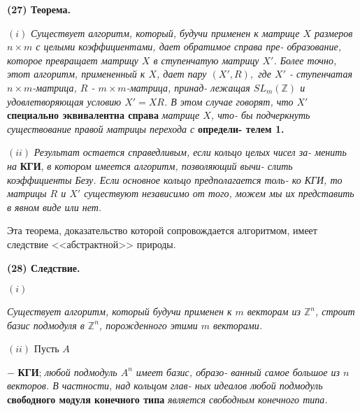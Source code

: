 	\pagebreak
	
	
	\noindent
	{\bf (27) Теорема.}
	
	$(i)$ {\it Существует алгоритм, который, будучи применен к матрице $X$\linebreak
	размеров $n\times m$ с целыми коэффициентами, дает обратимое справа пре-\linebreak
	образование, которое превращает матрицу $X$ в ступенчатую матрицу\linebreak
	$X'$. Более точно, этот алгоритм, примененный к $X$, дает пару $(X', R),$\linebreak
	где $X'$ - ступенчатая $n\times m$-матрица, $R$ - $m\times m$-матрица, принад-\linebreak
	лежащая $SL_{m}(\mathbb Z)$ и удовлетворяющая условию $X' = XR$. В этом случае\linebreak
	говорят, что $X'$} {\bf специально эквивалентна справа} {\it матрице $X$, \it что-\linebreak
	бы подчеркнуть существование правой матрицы перехода с} {\bf определи-\linebreak
	телем 1.}
	
	$(ii)$ {\it Результат остается справедливым, если кольцо целых чисел за-\linebreak
	менить на} {\bf КГИ}, {\it в котором имеется алгоритм, позволяющий вычи-\linebreak
	слить коэффициенты Безу. Если основное кольцо предполагается толь-\linebreak
	ко КГИ, то матрицы $R$ и $X'$ существуют независимо от того, можем\linebreak
	мы их представить в явном виде или нет.}
	
	Эта теорема, доказательство которой сопровождается алгоритмом,\linebreak
	имеет следствие <<абстрактной>> природы.
	
	\noindent
	{\bf (28) Следствие.}
	
	$(i)$ {\it Существует алгоритм, который будучи применен к $m$ векторам\linebreak
	из ${\mathbb Z}^{n}$, строит базис подмодуля в ${\mathbb Z}^{n}$, порожденного этими $m$ векторами.
	
	$(ii)$ Пусть $A$ }$-$ {\bf КГИ}; {\it любой подмодуль $A^{n}$ имеет базис, образо-\linebreak
	ванный самое большое из $n$ векторов. В частности, над кольцом глав-\linebreak
	ных идеалов любой подмодуль} {\bf свободного модуля конечного типа}\linebreak
	{\it является свободным конечного типа.}
	
